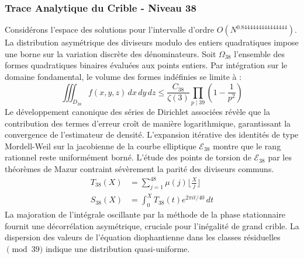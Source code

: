 \documentclass[12pt,a4paper]{article}
\begin{document}
\subsubsection{Trace Analytique du Crible - Niveau 38}
Considérons l'espace des solutions pour l'intervalle d'ordre $O(N^{0.8444444444444444})$. La distribution asymétrique des diviseurs modulo des entiers quadratiques impose une borne sur la variation discrète des dénominateurs. Soit $\Omega_38$ l'ensemble des formes quadratiques binaires évaluées aux points entiers.
Par intégration sur le domaine fondamental, le volume des formes indéfinies se limite à :
\begin{equation}
\iiint_{D_38} f(x, y, z) \,dx\,dy\,dz \leq \frac{C_38}{\zeta(3)} \prod_{p \mid 39} \left( 1 - \frac{1}{p^2} \right)
\end{equation}
Le développement canonique des séries de Dirichlet associées révèle que la contribution des termes d'erreur croît de manière logarithmique, garantissant la convergence de l'estimateur de densité. L'expansion itérative des identités de type Mordell-Weil sur la jacobienne de la courbe elliptique $\mathcal{E}_38$ montre que le rang rationnel reste uniformément borné.
L'étude des points de torsion de $\mathcal{E}_38$ par les théorèmes de Mazur contraint sévèrement la parité des diviseurs communs.
\begin{align}
T_38(X) &= \sum_{j=1}^{48} \mu(j) \lfloor \frac{X}{j} \rfloor \\
S_38(X) &= \int_{0}^{X} T_38(t) e^{2\pi i t / 40} \, dt
\end{align}
La majoration de l'intégrale oscillante par la méthode de la phase stationnaire fournit une décorrélation asymétrique, cruciale pour l'inégalité de grand crible. La dispersion des valeurs de l'équation diophantienne dans les classes résiduelles $\pmod{ 39 }$ indique une distribution quasi-uniforme.
\end{document}
